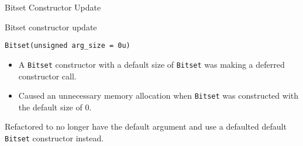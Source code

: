 

\begin{frame}[fragile]

  {\Huge Bitset Constructor Update}

\end{frame}


\begin{frame}[fragile]{Bitset constructor update}

\texttt{Bitset(unsigned arg\_size = 0u)}
\vspace{10pt}
\begin{itemize}
	\item A \texttt{Bitset} constructor with a default size of \texttt{Bitset} was making a deferred constructor call.
	\item Caused an unnecessary memory allocation when \texttt{Bitset} was constructed with the default size of 0.
\end{itemize}

\vspace{10pt}

Refactored to no longer have the default argument and use a defaulted default \texttt{Bitset} constructor instead.

\end{frame}

